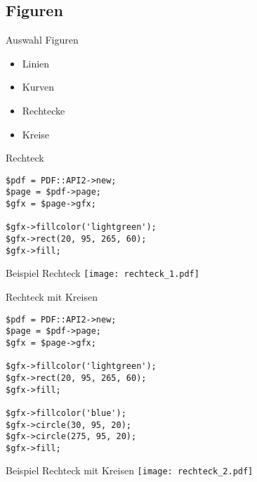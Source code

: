 \subsection{Figuren}
\begin{frame}{Auswahl Figuren}
\begin{itemize}
\item Linien
\item Kurven
\item Rechtecke
\item Kreise
\end{itemize}
\end{frame}

\begin{frame}[fragile]{Rechteck}
\begin{lstlisting}
$pdf = PDF::API2->new;
$page = $pdf->page;
$gfx = $page->gfx;

$gfx->fillcolor('lightgreen');
$gfx->rect(20, 95, 265, 60);
$gfx->fill;
\end{lstlisting}
\end{frame}

\begin{frame}{Beispiel Rechteck}
\texttt{[image: rechteck\_1.pdf]}
\end{frame}

\begin{frame}[fragile]{Rechteck mit Kreisen}
\begin{lstlisting}
$pdf = PDF::API2->new;
$page = $pdf->page;
$gfx = $page->gfx;

$gfx->fillcolor('lightgreen');
$gfx->rect(20, 95, 265, 60);
$gfx->fill;

$gfx->fillcolor('blue');
$gfx->circle(30, 95, 20);
$gfx->circle(275, 95, 20);
$gfx->fill;
\end{lstlisting}
\end{frame}

\begin{frame}{Beispiel Rechteck mit Kreisen}
\texttt{[image: rechteck\_2.pdf]}
\end{frame}




